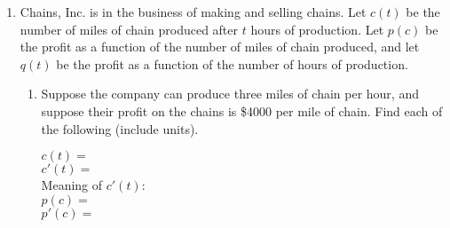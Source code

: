 \documentclass[letterpaper,11pt]{article}
\newif\ifsolutions
\newcommand{\sol}[2]{\begin{minipage}[c][#1]{\linewidth}{\textcolor{blue}{\textbf{Solution:}}\quad \textcolor{blue}{#2}}\end{minipage}}
\newcommand{\sol}[2]{\begin{minipage}[c][#1]{\linewidth}{\vfill}\end{minipage}}
\begin{document}
\begin{enumerate}






\item  Chains, Inc. is in the business of making and selling chains.  Let $c(t)$ be the number of miles of chain produced after $t$ hours of production.  Let $p(c)$ be the profit as a function of the number of miles of chain produced, and let $q(t)$ be the profit as a function of the number of hours of production.  
\begin{enumerate}
\item  Suppose the company can produce three miles of chain per hour, and suppose their profit on the chains is \$4000 per mile of chain.  Find each of the following (include units).

$c(t)= $ \ifsolutions \textcolor{blue}{ $3t$ miles}\fi\\

$c'(t)= $ \ifsolutions \textcolor{blue}{ $3$ miles/hour}\fi\\

Meaning of $c'(t)$: \ifsolutions \textcolor{blue}{ 3 feet of chain are produced per hour.}\fi\\

$p(c)= $ \ifsolutions \textcolor{blue}{ $4000c$ dollars}\fi\\

$p'(c)= $ \ifsolutions \textcolor{blue}{ $4000$ dollars/mile}\fi\\


\end{enumerate}
\end{enumerate}
\end{document}
